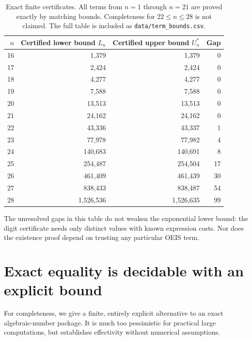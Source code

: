 \documentclass[11pt,letterpaper]{article}
\numberwithin{equation}{section}
\theoremstyle{definition}
\begin{document}
\begin{table}[ht]
\centering
\begin{tabular}{rrrr}
\toprule
$n$ & Certified lower bound $L_n$ & Certified upper bound $U_n^*$ & Gap\\
\midrule
16 & 1,379 & 1,379 & 0\\
17 & 2,424 & 2,424 & 0\\
18 & 4,277 & 4,277 & 0\\
19 & 7,588 & 7,588 & 0\\
20 & 13,513 & 13,513 & 0\\
21 & 24,162 & 24,162 & 0\\
22 & 43,336 & 43,337 & 1\\
23 & 77,978 & 77,982 & 4\\
24 & 140,683 & 140,691 & 8\\
25 & 254,487 & 254,504 & 17\\
26 & 461,409 & 461,439 & 30\\
27 & 838,433 & 838,487 & 54\\
28 & 1,526,536 & 1,526,635 & 99\\
\bottomrule
\end{tabular}
\caption{Exact finite certificates. All terms from $n=1$ through $n=21$ are
proved exactly by matching bounds. Completeness for $22\le n\le28$ is not
claimed. The full table is included as \texttt{data/term\_bounds.csv}.}
\label{tab:terms}
\end{table}

The unresolved gaps in this table do not weaken the exponential lower bound:
the digit certificate needs only distinct values with known expression costs.
Nor does the existence proof depend on trusting any particular OEIS term.

\section{Exact equality is decidable with an explicit bound}\label{sec:separation}

For completeness, we give a finite, entirely explicit alternative to an exact
algebraic-number package. It is much too pessimistic for practical large
computations, but establishes effectivity without numerical assumptions.
\end{document}
